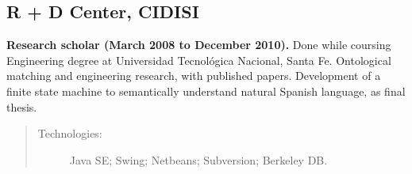 \subsection*{R + D Center, CIDISI}

\textbf{Research scholar (March 2008 to December 2010).} Done while coursing Engineering degree at Universidad Tecnológica Nacional, Santa Fe. Ontological matching and engineering research, with published papers. Development of a finite state machine to semantically understand natural Spanish language, as final thesis.

\begin{quote}
\begin{description}
    \item[Technologies:] Java SE; Swing; Netbeans; Subversion; Berkeley DB.    
\end{description}
\end{quote}